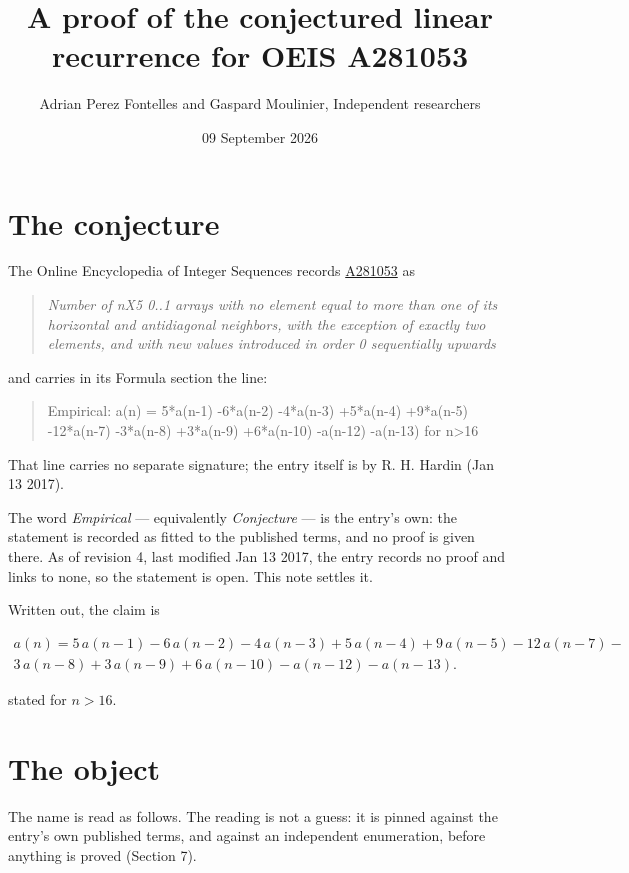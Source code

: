 \documentclass[11pt]{article}
\title{A proof of the conjectured linear recurrence for OEIS A281053}
\author{Adrian Perez Fontelles and Gaspard Moulinier, Independent researchers}
\date{09 September 2026}
\theoremstyle{definition}
\begin{document}
\maketitle
\section{The conjecture}

The Online Encyclopedia of Integer Sequences records \href{https://oeis.org/A281053}{A281053} as

\begin{quote}\itshape Number of nX5 0..1 arrays with no element equal to more than one of its horizontal and antidiagonal neighbors, with the exception of exactly two elements, and with new values introduced in order 0 sequentially upwards\end{quote}

and carries in its Formula section the line:

\begin{quote}\ttfamily Empirical: a(n) = 5*a(n-1) -6*a(n-2) -4*a(n-3) +5*a(n-4) +9*a(n-5) -12*a(n-7) -3*a(n-8) +3*a(n-9) +6*a(n-10) -a(n-12) -a(n-13) for n>16\end{quote}

That line carries no separate signature; the entry itself is by R. H. Hardin (Jan 13 2017).

The word {\itshape Empirical} --- equivalently {\itshape Conjecture} --- is the entry's own: the statement is recorded as fitted to the published terms, and no proof is given there. As of revision 4, last modified Jan 13 2017, the entry records no proof and links to none, so the statement is open. This note settles it.

Written out, the claim is

\begin{multline*} a(n) = 5\,a(n-1) - 6\,a(n-2) - 4\,a(n-3) + 5\,a(n-4) + 9\,a(n-5) - 12\,a(n-7) - \\ 3\,a(n-8) + 3\,a(n-9) + 6\,a(n-10) - a(n-12) - a(n-13). \end{multline*}

stated for $n > 16$.

\section{The object}

The name is read as follows. The reading is not a guess: it is pinned against the entry's own published terms, and against an independent enumeration, before anything is proved (Section 7).
\end{document}
